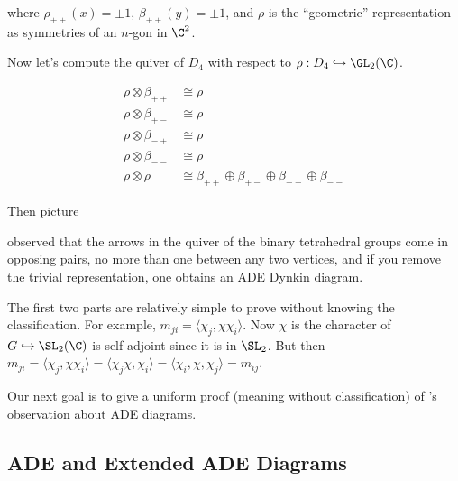 where $\rho_{\pm\pm}(x)=\pm1$, $\beta_{\pm\pm}(y)=\pm1$, and $\rho$ is the ``geometric'' representation as symmetries of an $n$-gon in $\C^2$.

Now let's compute the \mc quiver of $D_4$ with respect to $\rho: D_4 \hookrightarrow \GL_2(\C)$. 

	
	\[
	\begin{split}
	\rho \otimes \beta_{++} &\cong \rho \\
	\rho \otimes \beta_{+-} &\cong \rho \\
	\rho \otimes \beta_{-+} &\cong \rho \\
	\rho \otimes \beta_{--} &\cong \rho \\
	\rho \otimes \rho &\cong \beta_{++} \oplus \beta_{+-} \oplus \beta_{-+} \oplus \beta_{--}
	\end{split}
	\]




Then picture





\mc observed that the arrows in the \mc quiver of the binary tetrahedral groups come in opposing pairs, no more than one between any two vertices, and if you remove the trivial representation, one obtains an ADE Dynkin diagram. 


The first two parts are relatively simple to prove without knowing the classification. For example, $m_{ji}= \langle \chi_j,\chi\chi_i \rangle$. Now $\chi$ is the character of $G \hookrightarrow \SL_2(\C)$ is self-adjoint since it is in $\SL_2$. But then $m_{ji}= \langle \chi_j,\chi\chi_i \rangle= \langle \chi_j\chi,\chi_i \rangle= \langle \chi_i, \chi,\chi_j \rangle=m_{ij}$. 


Our next goal is to give a uniform proof (meaning without classification) of \mc's observation about ADE diagrams. 




\subsection{ADE and Extended ADE Diagrams}


